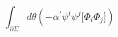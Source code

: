\begin{equation}
\int_{\partial\Sigma}d\theta(-\alpha^\prime\psi^i\psi^j\lbrack\Phi_i\Phi_j\rbrack)
\end{equation}

